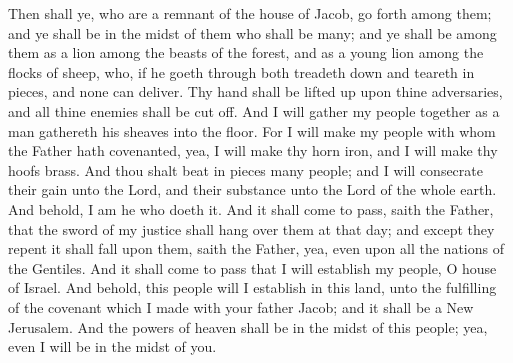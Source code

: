 Then shall ye, who are a remnant of the house of Jacob, go forth among them; and ye shall be in the midst of them who shall be many; and ye shall be among them as a lion among the beasts of the forest, and as a young lion among the flocks of sheep, who, if he goeth through both treadeth down and teareth in pieces, and none can deliver.
\bverse \iffalse Thy hand shall be lifted up upon thine adversaries, and all thine enemies shall be cut off. \fi
Thy hand shall be lifted up upon thine adversaries, and all thine enemies shall be cut off.
\bverse \iffalse And I will gather my people together as a man gathereth his sheaves into the floor. \fi
And I will gather my people together as a man gathereth his sheaves into the floor.
\bverse \iffalse For I will make my people with whom the Father hath covenanted, yea, I will make thy horn iron, and I will make thy hoofs brass. And thou shalt beat in pieces many people; and I will consecrate their gain unto the Lord, and their substance unto the Lord of the whole earth. And behold, I am he who doeth it. \fi
For I will make my people with whom the Father hath covenanted, yea, I will make thy horn iron, and I will make thy hoofs brass. And thou shalt beat in pieces many people; and I will consecrate their gain unto the Lord, and their substance unto the Lord of the whole earth. And behold, I am he who doeth it.
\bverse \iffalse And it shall come to pass, saith the Father, that the sword of my justice shall hang over them at that day; and except they repent it shall fall upon them, saith the Father, yea, even upon all the nations of the Gentiles. \fi
And it shall come to pass, saith the Father, that the sword of my justice shall hang over them at that day; and except they repent it shall fall upon them, saith the Father, yea, even upon all the nations of the Gentiles.
\bverse \iffalse And it shall come to pass that I will establish my people, O house of Israel. \fi
And it shall come to pass that I will establish my people, O house of Israel.
\bverse \iffalse And behold, this people will I establish in this land, unto the fulfilling of the covenant which I made with your father Jacob; and it shall be a New Jerusalem. And the powers of heaven shall be in the midst of this people; yea, even I will be in the midst of you. \fi
And behold, this people will I establish in this land, unto the fulfilling of the covenant which I made with your father Jacob; and it shall be a New Jerusalem. And the powers of heaven shall be in the midst of this people; yea, even I will be in the midst of you.
